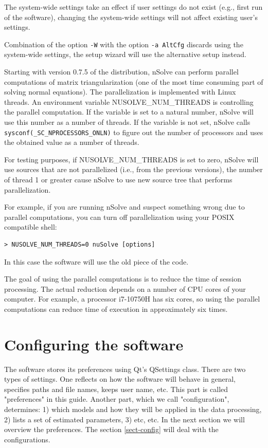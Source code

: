 \documentclass [10pt,letterpaper]{report}
\newcommand{\nuSolve}{\greektext n\latintext Solve}
\begin{document}
{The system-wide settings take an effect if user settings do not exist (e.g., first
run of the software), changing the system-wide settings will not affect existing
user's settings.

Combination of the option {\tt -W} with the option {\tt -a AltCfg} discards
using the system-wide settings, the setup wizard will use the alternative setup
instead.


Starting with version 0.7.5 of the distribution, \nuSolve{} can perform parallel
computations of matrix triangularization (one of the most time consuming part of
solving normal equations). The parallelization is implemented with Linux threads.
An environment variable NUSOLVE\_NUM\_THREADS is controlling the parallel
computation. If the variable is set to a natural number, \nuSolve{} will use
this number as a number of threads. If the variable is not set, \nuSolve{}
calls {\tt sysconf(\_SC\_NPROCESSORS\_ONLN)} to figure out the number of processors
and uses the obtained value as a number of threads.

For testing purposes, if NUSOLVE\_NUM\_THREADS is set to zero, \nuSolve{} will
use sources that are not parallelized (i.e., from the previous versions), the number
of thread 1 or greater cause \nuSolve{} to use new source tree that performs
parallelization.

For example, if you are running \nuSolve{} and suspect something wrong due
to parallel computations, you can turn off parallelization using your POSIX 
compatible shell:

\begin{verbatim}
> NUSOLVE_NUM_THREADS=0 nuSolve [options]
\end{verbatim}
\noindent
In this case the software will use the old piece of the code.

The goal of using the parallel computations is to reduce the time of session processing.
The actual reduction depends on a number of CPU cores of your computer. For example,
a processor i7-10750H has six cores, so using the parallel computations can reduce
time of execution in approximately six times.





%
%
\chapter{Configuring the software}
\label{chapter-config}
The software stores its preferences using Qt's QSettings class. There
are two types of settings. One reflects on how the software will
behave in general, specifies paths and file names, keeps user name, etc.
This part is called "preferences" in this guide. Another part, which we
call "configuration", determines: 1) which models and how they will be
applied in the data processing, 2) lists a set of estimated parameters,
3) etc, etc. In the next section we will overview the preferences. The
section \ref{sect-config} will deal with the configurations.





}
\end{document}
